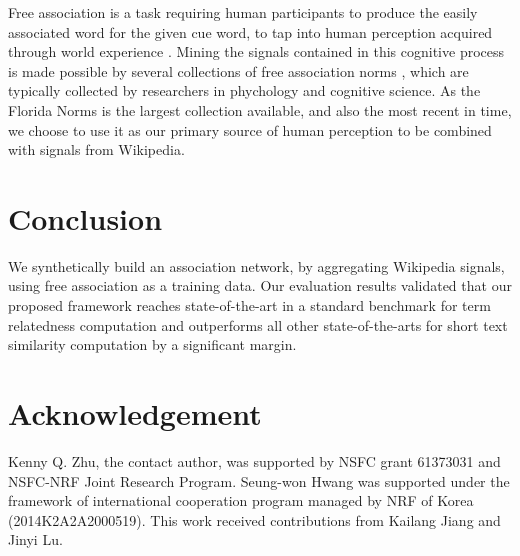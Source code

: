 \documentclass[letterpaper]{article}
\begin{document}
Free association is a task requiring human participants to produce the
easily associated word for the given cue word, to tap into human perception acquired through
world experience \cite{Nelson:2004}.
Mining the signals contained in this cognitive process
is made possible by several collections of free association norms
 \cite{Nelson:2004,kent1910study,Minnesota,kiss1973associative},
which are typically collected by researchers in phychology and
cognitive science. As the Florida Norms is the
largest collection available, and also the most recent in time,
we choose to use it as our primary source of human perception
to be combined with signals from Wikipedia.

\section{Conclusion}
\label{sec:conclude}

We synthetically
build an association network, by aggregating Wikipedia
signals, using free association as a training data. 
Our evaluation results
validated that our proposed framework reaches state-of-the-art
in a standard benchmark for term relatedness computation and
outperforms all other state-of-the-arts for short text similarity
computation by a significant margin.

\section*{Acknowledgement}
Kenny Q. Zhu, the contact author, was supported by
NSFC grant 61373031 and NSFC-NRF Joint Research Program.
Seung-won Hwang was supported  under the framework of international 
cooperation program managed by NRF of 
Korea (2014K2A2A2000519). This work received contributions from
Kailang Jiang and Jinyi Lu.


{\small
}
\end{document}
